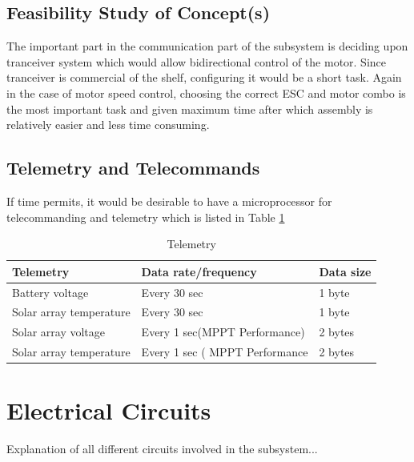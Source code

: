 \subsection{Feasibility Study of Concept(s)}

The important part in the communication part of the subsystem is deciding upon tranceiver system which would allow bidirectional control of the motor. Since tranceiver is commercial of the shelf, configuring it would be a short task.
Again in the case of motor speed control, choosing the correct ESC and motor combo is the most important task and given maximum time after which assembly is relatively easier and less time consuming.

\subsection{Telemetry and Telecommands}

If time permits, it would be desirable to have a microprocessor for telecommanding and telemetry  which is listed in Table \ref{tab:Telemetry}

\begin{table}[h]
\centering
\begin{tabular}{|l|l|l|}
\hline
\textbf{Telemetry} & \textbf{Data rate/frequency} & \textbf{Data size} \\
\hline
Battery voltage & Every 30 sec & 1 byte \\
\hline
Solar array temperature & Every 30 sec & 1 byte\\
\hline
Solar array voltage & Every 1 sec(MPPT Performance) & 2 bytes\\
\hline
Solar array temperature & Every 1 sec ( MPPT Performance & 2 bytes\\
\hline

\end{tabular}
\caption{Telemetry}
\label{tab:Telemetry}
\end{table}

\section{Electrical Circuits}

Explanation of all different circuits involved in the subsystem...